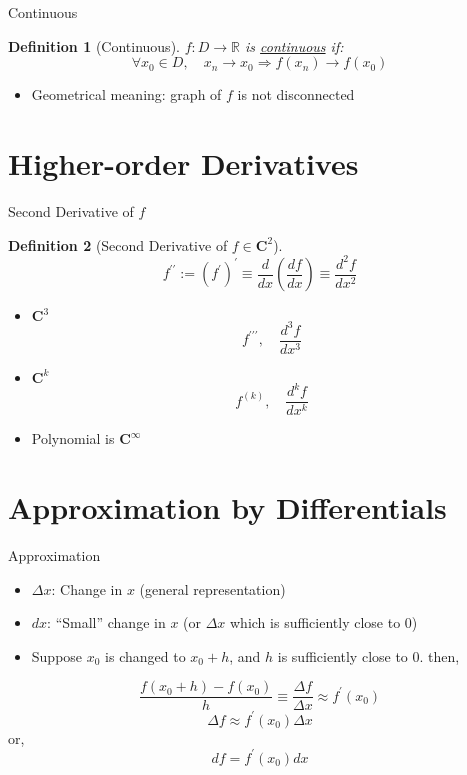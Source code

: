 \documentclass[final]{beamer}
\newtheorem{defn}{Definition}
\begin{document}
\begin{frame}[t]{Continuous}
	\begin{defn}
		[Continuous]
		$f:D\rightarrow \mathbb{R}$ is \uline{continuous} if:\[
			\forall x_0 \in D,\quad x_n \rightarrow x_0 \Rightarrow f(x_n)\rightarrow f(x_0)
		\]
	\end{defn}
	\begin{itemize}
		\item Geometrical meaning: graph of $f$ is not disconnected
	\end{itemize}
\end{frame}


\section{Higher-order Derivatives} %
\label{sec:higher_order_derivatives}

\begin{frame}[t]{Second Derivative of $f$}
	\begin{defn}
		[Second Derivative of $f\in \mathbf{C}^2$]
		\[
			f^{\prime\prime} := (f^\prime)^\prime \equiv \frac{d}{dx}\left(\frac{df}{dx}\right) \equiv \frac{d^2f}{dx^2}
		\]
	\end{defn}
	\begin{itemize}
		\item $\mathbf{C}^3$
		\[
			f^{\prime\prime\prime},\quad \frac{d^3f}{dx^3}
		\]
		\item $\mathbf{C}^k$
		\[
			f^{(k)},\quad \frac{d^kf}{dx^k}
		\]
		\item Polynomial is $\mathbf{C}^\infty$
	\end{itemize}
\end{frame}

\section{Approximation by Differentials} %
\label{sec:approximation_by_differentials}


\begin{frame}[t]{Approximation}
	\begin{itemize}
		\item $\Delta x$: Change in $x$ (general representation)
		\item $dx$: ``Small'' change in $x$ (or $\Delta x$ which is sufficiently close to 0)
		\item Suppose $x_0$ is changed to $x_0+h$, and $h$ is sufficiently close to 0. then, 
	\end{itemize}
	\[
		\frac{f(x_0+h)-f(x_0)}{h}\equiv \frac{\Delta f}{\Delta x} \approx f^\prime (x_0)
	\]
	\[
		\Delta f \approx f^\prime (x_0) \Delta x
	\] or, \[
		df = f^\prime (x_0) dx
	\]
\end{frame}
\end{document}
